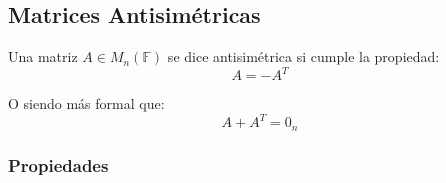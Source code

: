 \documentclass[12pt]{report}                                    %
\begin{document}
            \clearpage
            \subsection{Matrices Antisimétricas}

                Una matriz $A \in M_{n}(\mathbb{F})$ se dice antisimétrica si cumple la propiedad:
                \begin{equation}
                    A = -A^T
                \end{equation}

                O siendo más formal que:
                \begin{equation}
                    A + A^T = 0_{n}
                \end{equation}

                \subsubsection{Propiedades}
\end{document}
